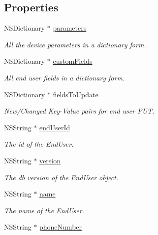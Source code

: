 \subsection*{Properties}
\begin{DoxyCompactItemize}
\item 
N\+S\+Dictionary $\ast$ \hyperlink{class_x_i_end_user_info_a8c637fed226db0eba6ded513a9cb6752}{parameters}
\begin{DoxyCompactList}\small\item\em All the device parameters in a dictionary form. \end{DoxyCompactList}\item 
N\+S\+Dictionary $\ast$ \hyperlink{class_x_i_end_user_info_ac5d2e5743d4826b013c5eb21d3a93898}{custom\+Fields}
\begin{DoxyCompactList}\small\item\em All end user fields in a dictionary form. \end{DoxyCompactList}\item 
N\+S\+Dictionary $\ast$ \hyperlink{class_x_i_end_user_info_a511da2c1ab0e1f4f83bafdbff246da6b}{fields\+To\+Update}
\begin{DoxyCompactList}\small\item\em New/\+Changed Key-\/\+Value pairs for end user P\+UT. \end{DoxyCompactList}\item 
N\+S\+String $\ast$ \hyperlink{class_x_i_end_user_info_a40a558596a4e490f4529328dc1a03749}{end\+User\+Id}
\begin{DoxyCompactList}\small\item\em The id of the End\+User. \end{DoxyCompactList}\item 
N\+S\+String $\ast$ \hyperlink{class_x_i_end_user_info_a7102ce0a22f4680c5c9eb895fa4386aa}{version}
\begin{DoxyCompactList}\small\item\em The db version of the End\+User object. \end{DoxyCompactList}\item 
N\+S\+String $\ast$ \hyperlink{class_x_i_end_user_info_a24a1bd487185ee783d4572de4f2759d2}{name}
\begin{DoxyCompactList}\small\item\em The name of the End\+User. \end{DoxyCompactList}\item 
N\+S\+String $\ast$ \hyperlink{class_x_i_end_user_info_a84b3f0878ff55bca6fb70d26afc7911a}{phone\+Number}

\end{DoxyCompactItemize}
